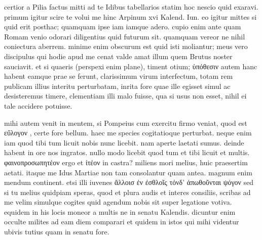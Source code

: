 


 certior a Pilia factus mitti ad te Idibus tabellarios statim hoc nescio quid exaravi. primum igitur scire te volui me hinc Arpinum xvi Kalend. Iun. eo igitur mittes si quid erit posthac; quamquam ipse iam iamque adero. cupio enim ante quam Romam venio odorari diligentius quid futurum sit. quamquam vereor ne nihil coniectura aberrem. minime enim obscurum est quid isti moliantur; meus vero discipulus qui hodie apud me cenat valde amat illum quem Brutus noster sauciavit. et si quaeris (perspexi enim plane), timent otium; ὑπόθεσιν autem hanc habent eamque prae se ferunt, clarissimum virum interfectum, totam rem publicam illius interitu perturbatam, inrita fore quae ille egisset simul ac desisteremus timere, clementiam illi malo fuisse, qua si usus non esset, nihil ei tale accidere potuisse.

 mihi autem venit in mentem, si Pompeius cum exercitu firmo veniat, quod est εὔλογον , certe fore bellum. haec me species cogitatioque perturbat. neque enim iam quod tibi tum licuit nobis nunc licebit. nam aperte laetati sumus. deinde habent in ore nos ingratos. nullo modo licebit quod tum et tibi licuit et multis. φαινοπροσωπητέον ergo et ἰτέον in castra? miliens mori melius, huic praesertim aetati. itaque me Idus Martiae non tam consolantur quam antea. magnum enim mendum continent. etsi illi iuvenes ἄλλοισ ἐν ἐσθλοῖς τόνδ' ἀπωθοῦνται ψόγον sed si tu melius quidpiam speras, quod et plura audis et interes consiliis, scribas ad me velim simulque cogites quid agendum nobis sit super legatione votiva. equidem in his locis moneor a multis ne in senatu Kalendis. dicuntur enim occulte milites ad eam diem comparari et quidem in istos qui mihi videntur ubivis tutius quam in senatu fore.
